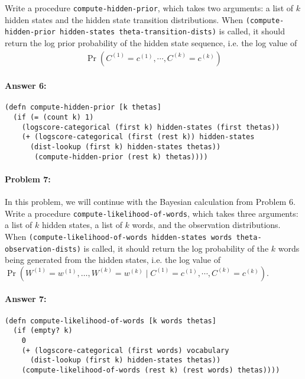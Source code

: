 \documentclass[12pt, letterpaper]{article}
\begin{document}
Write a procedure \texttt{compute-hidden-prior}, which takes two
arguments: a list of $k$ hidden states and the hidden state transition
distributions. When \texttt{(compute-hidden-prior hidden-states
  theta-transition-dists)} is called, it should return the log prior
probability of the hidden state sequence, i.e. the log value of
\begin{gather*}
    \Pr(C^{(1)}=c^{(1)},\cdots,C^{(k)}=c^{(k)})
\end{gather*}

\paragraph{Answer 6:}\begin{lstlisting}
(defn compute-hidden-prior [k thetas]
  (if (= (count k) 1)
    (logscore-categorical (first k) hidden-states (first thetas)) 
    (+ (logscore-categorical (first (rest k)) hidden-states
      (dist-lookup (first k) hidden-states thetas))
       (compute-hidden-prior (rest k) thetas))))
\end{lstlisting}

\hrulefill
\paragraph{Problem 7:}

In this problem, we will continue with the Bayesian calculation from
Problem 6. Write a procedure \texttt{compute-likelihood-of-words},
which takes three arguments: a list of $k$ hidden states, a list of
$k$ words, and the observation distributions. When
\texttt{(compute-likelihood-of-words hidden-states words
  theta-observation-dists)} is called, it should return the log
probability of the $k$ words being generated from the hidden states,
i.e. the log value of
$\Pr( W^{(1)}=w^{(1)},\dots,W^{(k)}=w^{(k)} \mid
C^{(1)}=c^{(1)},\cdots,C^{(k)}=c^{(k)})$.

\paragraph{Answer 7:}\begin{lstlisting}
(defn compute-likelihood-of-words [k words thetas]
  (if (empty? k)
    0
    (+ (logscore-categorical (first words) vocabulary 
      (dist-lookup (first k) hidden-states thetas)) 
    (compute-likelihood-of-words (rest k) (rest words) thetas))))
\end{lstlisting}

\hrulefill
\end{document}
